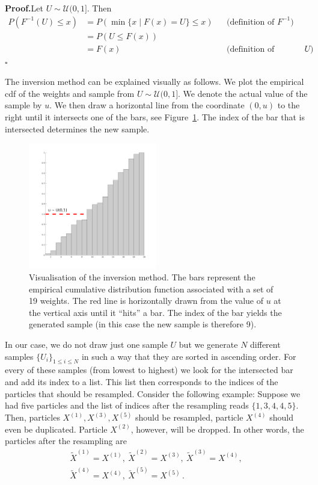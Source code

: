 \textbf{Proof.}\quad Let $U \sim \mathcal{U} (0,1]$. Then
\begin{align*}
  P(F^{-1}(U) \le x) &= P(\min \{x \mid F(x) = U \} \le x ) && \text{(definition of $F^{-1}$)} \\
                     &= P(U \le F(x)) \\
                     &= F(x) && \text{(definition of distribution of $U$)}\,.
\end{align*}
\hfill$\square$

The inversion method can be explained visually as follows. We plot the
empirical cdf of the weights and sample from
$U \sim \mathcal{U}(0,1]$. We denote the actual value of the sample by
$u$. We then draw a horizontal line from the coordinate $(0,u)$ to the
right until it intersects one of the bars, see
Figure~\ref{fig:ecdf}. The index of the bar that is intersected
determines the new sample.

\begin{figure}
  \centering \includegraphics[width=0.5\textwidth]{figures/ecdf.png}
  \caption{Visualisation of the inversion method. The bars represent
    the empirical cumulative distribution function associated with a
    set of 19 weights. The red line is horizontally drawn from the
    value of $u$ at the vertical axis until it ``hits'' a bar. The
    index of the bar yields the generated sample (in this case the new
    sample is therefore 9). }
  \label{fig:ecdf}
\end{figure}

In our case, we do not draw just one sample $U$ but we generate $N$
different samples $\{U_i\}_{1 \le i \le N}$ in such a way that they
are sorted in ascending order. For every of these samples (from lowest
to highest) we look for the intersected bar and add its index to a
list. This list then corresponds to the indices of the particles that
should be resampled. Consider the following example: Suppose we had
five particles and the list of indices after the resampling reads
$\{1,3,4,4,5\}$. Then, particles $X^{(1)},X^{(3)},X^{(5)}$ should be
resampled, particle $X^{(4)}$ should even be duplicated. Particle
$X^{(2)}$, however, will be dropped. In other words, the particles
after the resampling are
\begin{gather*}
  \tilde{X}^{(1)}=X^{(1)},\ \tilde{X}^{(2)}=X^{(3)},\ \tilde{X}^{(3)}=X^{(4)},\\
  \tilde{X}^{(4)}=X^{(4)},\ \tilde{X}^{(5)}=X^{(5)}\,.
\end{gather*}

